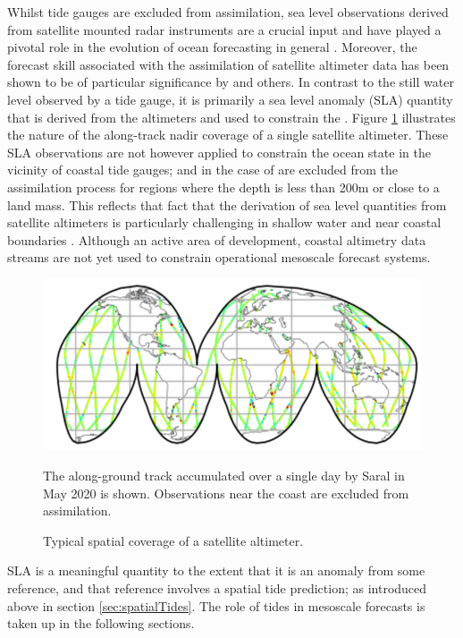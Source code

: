 Whilst tide gauges are excluded from assimilation, sea level observations derived from satellite mounted radar instruments are a crucial input and have played a pivotal role in the evolution of ocean forecasting in general \citep{Fu:2001ub}.  Moreover, the forecast skill associated with the assimilation of satellite altimeter data has been shown to be of particular significance by  \citep{10.5194/os-13-1077-2017} and others.
In contrast to the still water level observed by a tide gauge, it is primarily a sea level anomaly (SLA) quantity that is derived from the altimeters and used to constrain the \OGCM{}. Figure \ref{fig:altimeterEg} illustrates the nature of the along-track nadir coverage of a single satellite altimeter.
These SLA observations are not however applied to constrain the ocean state in the vicinity of coastal tide gauges; and in the case of \BL{} are excluded from the assimilation process for regions where the depth is less than 200m or close to a land mass.   This reflects that fact that the derivation of sea level quantities from satellite altimeters is particularly challenging in shallow water and near coastal boundaries \citep{Woodworth:2011bf}.    Although an active area of development, coastal altimetry data streams are not yet used to constrain operational mesoscale forecast  systems.
\begin{figure}[!hbt] \centering
  \includegraphics[width=\figwidthHalf]{figures/maps/altimeterCoverageEg.png}
  \caption{Typical spatial coverage of a satellite altimeter.}
          {The along-ground track accumulated over a single day by Saral in May 2020 is shown. Observations near the coast are excluded from assimilation.}
  \label{fig:altimeterEg}
\end{figure}
SLA is a meaningful quantity to the extent that it is an anomaly from some reference, and that reference involves a spatial tide prediction; as introduced above in section \ref{sec:spatialTides}.
The role of tides in mesoscale forecasts is taken up in the following sections.
